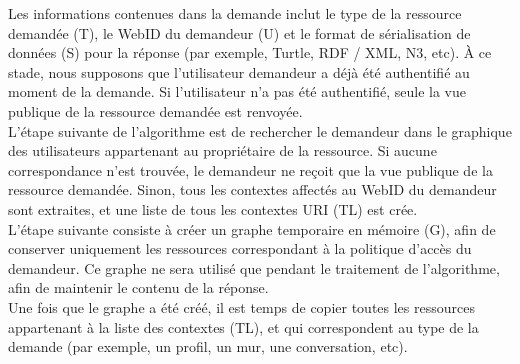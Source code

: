 Les informations contenues dans la demande inclut le type de la ressource demandée (T), le WebID du demandeur (U) et le format de sérialisation de données (S) pour la réponse (par exemple, Turtle, RDF / XML, N3, etc). À ce stade, nous supposons que l'utilisateur demandeur a déjà été authentifié au moment de la demande. Si l'utilisateur n'a pas été authentifié, seule la vue publique de la ressource demandée est renvoyée.\\


L'étape suivante de l'algorithme est de rechercher le demandeur dans le graphique des utilisateurs appartenant au propriétaire de la ressource. Si aucune correspondance n'est trouvée, le demandeur ne reçoit que la vue publique de la ressource demandée. Sinon, tous les contextes affectés au WebID du demandeur sont extraites, et une liste de tous les contextes URI (TL) est crée.\\


L'étape suivante consiste à créer un graphe temporaire en mémoire (G), afin de conserver uniquement les ressources correspondant à la politique d'accès du demandeur. Ce graphe ne sera utilisé que pendant le traitement de l'algorithme, afin de maintenir le contenu de la réponse.\\


Une fois que le graphe a été créé, il est temps de copier toutes les ressources appartenant à la liste des contextes (TL), et qui correspondent au type de la demande (par exemple, un profil, un mur, une conversation, etc).\\


